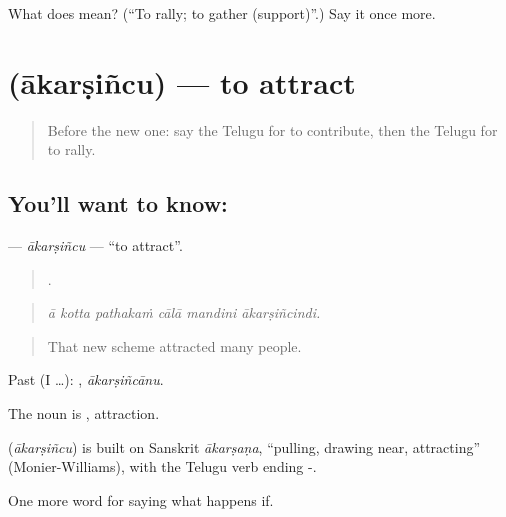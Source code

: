 \begin{tcolorbox}[breakable,colback=teal!4,colframe=teal!35!black,title={Before you move on}]
What does  mean? (\textquotedblleft{}To rally; to gather (support)\textquotedblright{}.) Say it once more.
\end{tcolorbox}
\section[\texorpdfstring{\te{ఆకర్షించు} (ākarṣiñcu)}{ఆకర్షించు (ākarṣiñcu)}]{ (ākarṣiñcu) — to attract}

\label{lesson:TE-C436-akarsincu}



\begin{quote}
Before the new one: say the Telugu for to contribute, then the Telugu for to rally.
\end{quote}

\subsection*{You'll want to know: }
\textbf{} — \emph{ākarṣiñcu} — \textquotedblleft{}to attract\textquotedblright{}.

\begin{quote}
     .
\end{quote}

\begin{quote}
\emph{ā kotta pathakaṁ cālā mandini ākarṣiñcindi.}
\end{quote}

\begin{quote}
That new scheme attracted many people.
\end{quote}

Past (I …): , \emph{ākarṣiñcānu}.

The noun is , attraction.

\begin{cousinweb}
\textbf{} (\emph{ākarṣiñcu}) is built on Sanskrit \emph{ākarṣaṇa}, \textquotedblleft{}pulling, drawing near, attracting\textquotedblright{} (Monier-Williams), with the Telugu verb ending -.
\end{cousinweb}

\begin{grammarlens}[title={What you've built}]
One more word for saying what happens if.
\end{grammarlens}

